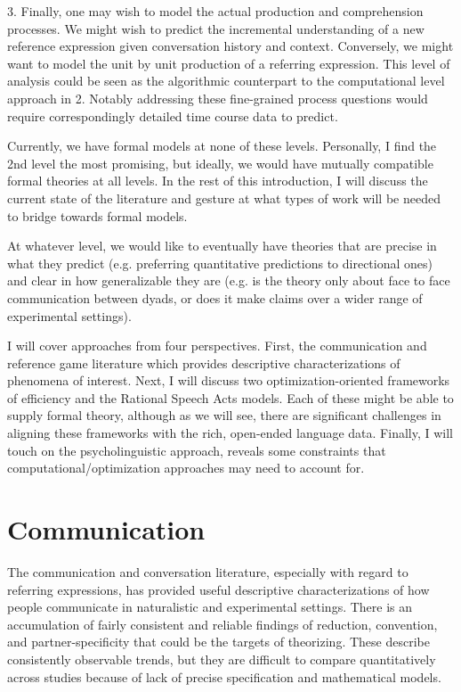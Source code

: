 \documentclass[]{article}
\begin{document}
	3. Finally, one may wish to model the actual production and comprehension processes. We might wish to predict the incremental understanding of a new reference expression given conversation history and context. Conversely, we might want to model the unit by unit production of a referring expression. This level of analysis could be seen as the algorithmic counterpart to the computational level approach in 2. Notably addressing these fine-grained process questions would require correspondingly detailed time course data to predict. 
	
	
	
	Currently, we have formal models at none of these levels. Personally, I find the 2nd level the most promising, but ideally, we would have mutually compatible formal theories at all levels. In the rest of this introduction, I will discuss the current state of the literature and gesture at what types of work will be needed to bridge towards formal models. 
	
		At whatever level, we would like to eventually have theories that are precise in what they predict (e.g. preferring quantitative predictions to directional ones) and clear in how generalizable they are (e.g. is the theory only about face to face communication between dyads, or does it make claims over a wider range of experimental settings). 
		
	I will cover approaches from four perspectives. First, the communication and reference game literature which provides descriptive characterizations of phenomena of interest. Next, I will discuss two optimization-oriented frameworks of efficiency and the Rational Speech Acts models. Each of these might be able to supply formal theory, although as we will see, there are significant challenges in aligning these frameworks with the rich, open-ended language data. Finally, I will touch on the psycholinguistic approach, reveals some constraints that computational/optimization approaches may need to account for. 
	


\section{Communication}

The communication and conversation literature, especially with regard to referring expressions, has provided useful descriptive characterizations of how people communicate in naturalistic and experimental settings. There is an accumulation of fairly consistent and reliable findings of reduction, convention, and partner-specificity that could be the targets of theorizing. These describe consistently observable trends, but they are difficult to compare quantitatively across studies because of lack of precise specification and mathematical models.
\end{document}
